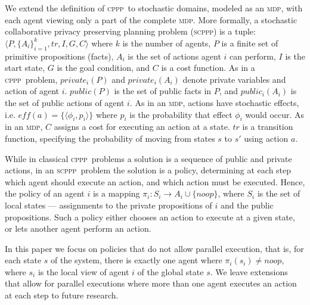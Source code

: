 \documentclass[letterpaper]{article} %
\newcommand{\cppp}{\textsc {cppp}\xspace}
\newcommand{\scppp}{\textsc {scppp}\xspace}
\newcommand{\mdp}{\textsc {mdp}\xspace}
\theoremstyle{remark}
\begin{document}
We extend the definition of \cppp\ to stochastic domains, modeled as an \mdp, with each agent viewing only a part of the complete \mdp.
More formally, a stochastic collaborative privacy preserving planning problem (\scppp) is a tuple: $\langle P, \{A_i\}_{i=1}^k, tr, I ,G, C \rangle$ where
$k$ is the number of agents, $P$ is a finite set of primitive propositions (facts), $A_i$ is the set of actions agent $i$ can perform,  $I$ is the start state, $G$ is the goal condition, and $C$ is a cost function.
As in a \cppp\  problem, $private_i(P)$ and $private_i(A_i)$ denote private variables and action of agent $i$. $public(P)$ is the set of public facts in $P$, and $public_i(A_i)$ is the set of public actions of agent $i$.
As in an \mdp, actions have stochastic effects, i.e. $\mathit{eff}(a)=\{\langle \phi_i, p_i \rangle\}$ where $p_i$ is the probability that effect $\phi_i$ would occur. As in an \mdp, $C$ assigns a cost for executing an action at a state. $tr$ is a transition function, specifying the probability of moving from states $s$ to $s'$ using action $a$.

While in classical \cppp\ problems a solution is a sequence of public and private actions, in an \scppp\ problem the solution is a policy, determining at each step which agent should execute an action, and which action must be executed. Hence, the policy of an agent $i$ is a mapping  $\pi_i: S_i \rightarrow A_i \cup \{\mathit{noop}\}$, where $S_i$ is the set of local states --- assignments to the private propositions of $i$ and the public propositions. Such a policy either chooses an action to execute at a given state, or lets another agent perform an action.

In this paper we focus on policies that do not allow parallel execution, that is, for each state $s$ of the system, there is exactly one agent where $\pi_i(s_i) \neq \mathit{noop}$, where $s_i$ is the local view of agent $i$ of the global state $s$.
We leave extensions that allow for parallel executions where more than one agent executes an action at each step to future research.
\end{document}
